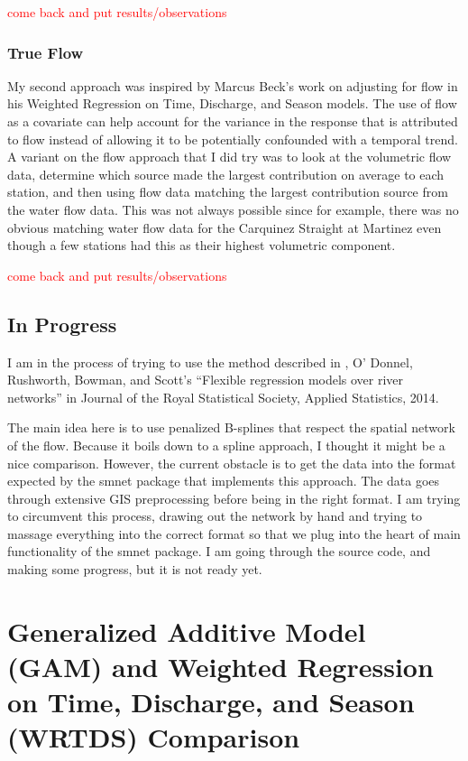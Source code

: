 \documentclass[12pt]{amsart}
\begin{document}
\textcolor{red}{come back and put results/observations}


\subsubsection{True Flow}

My second approach was inspired by Marcus Beck's work on adjusting for flow in his Weighted Regression on Time, Discharge, and Season models. The use of flow as a covariate can help account for the variance in the response that is attributed to flow instead of allowing it to be potentially confounded with a temporal trend. \textcolor{To make this approach more spatial, I should go back and fit a spatial model with flow as a covariate allowing as many of the temporal components to vary by station as possible. Then at least the flows from each station can be leveraged.} A variant on the flow approach that I did try was to look at the volumetric flow data, determine which source made the largest contribution on average to each station, and then using flow data matching the largest contribution source from the water flow data. This was not always possible since for example, there was no obvious matching water flow data for the Carquinez Straight at Martinez even though a few stations had this as their highest volumetric component.

\textcolor{red}{come back and put results/observations}

\subsection{In Progress}

I am in the process of trying to use the method described in , O' Donnel, Rushworth, Bowman, and Scott's ``Flexible regression models over river networks'' in Journal of the Royal Statistical Society, Applied Statistics, 2014.

The main idea here is to use penalized B-splines that respect the spatial network of the flow. Because it boils down to a spline approach, I thought it might be a nice comparison. However, the current obstacle is to get the data into the format expected by the smnet package that implements this approach. The data goes through extensive GIS preprocessing before being in the right format. I am trying to circumvent this process, drawing out the network by hand and trying to massage everything into the correct format so that we plug into the heart of main functionality of the smnet package. I am going through the source code, and making some progress, but it is not ready yet.




\section{Generalized Additive Model (GAM) and Weighted Regression on Time, Discharge, and Season (WRTDS) Comparison}
\end{document}
